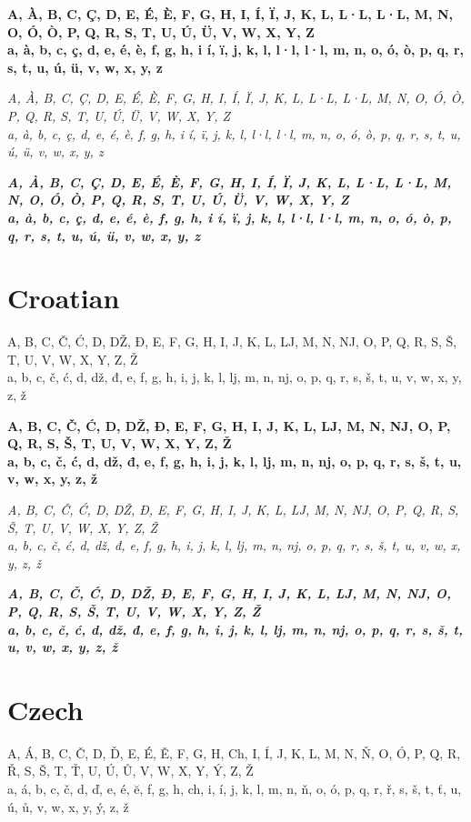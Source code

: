 \documentclass[12pt]{article}
\begin{document}
\textbf{
A, À, B, C, Ç, D, E, É, È, F, G, H, I, Í, Ï, J, K, L, L·L, L·L, M, N, O, Ó, Ò, P, Q, R, S, T, U, Ú, Ü, V, W, X, Y, Z \\
a, à, b, c, ç, d, e, é, è, f, g, h, i í, ï, j, k, l, l·l, l·l, m, n, o, ó, ò, p, q, r, s, t, u, ú, ü, v, w, x, y, z
}

\textit{
A, À, B, C, Ç, D, E, É, È, F, G, H, I, Í, Ï, J, K, L, L·L, L·L, M, N, O, Ó, Ò, P, Q, R, S, T, U, Ú, Ü, V, W, X, Y, Z \\
a, à, b, c, ç, d, e, é, è, f, g, h, i í, ï, j, k, l, l·l, l·l, m, n, o, ó, ò, p, q, r, s, t, u, ú, ü, v, w, x, y, z
}

\textbf{\textit{
A, À, B, C, Ç, D, E, É, È, F, G, H, I, Í, Ï, J, K, L, L·L, L·L, M, N, O, Ó, Ò, P, Q, R, S, T, U, Ú, Ü, V, W, X, Y, Z \\
a, à, b, c, ç, d, e, é, è, f, g, h, i í, ï, j, k, l, l·l, l·l, m, n, o, ó, ò, p, q, r, s, t, u, ú, ü, v, w, x, y, z
}}


\section{Croatian}
A, B, C, Č, Ć, D, DŽ, Đ, E, F, G, H, I, J, K, L, LJ, M, N, NJ, O, P, Q, R, S, Š, T, U, V, W,  X, Y, Z, Ž \\
a, b, c, č, ć, d, dž, đ, e, f, g, h, i, j, k, l, lj, m, n, nj, o, p, q, r, s, š, t, u, v, w, x, y, z, ž

\textbf{
A, B, C, Č, Ć, D, DŽ, Đ, E, F, G, H, I, J, K, L, LJ, M, N, NJ, O, P, Q, R, S, Š, T, U, V, W,  X, Y, Z, Ž \\
a, b, c, č, ć, d, dž, đ, e, f, g, h, i, j, k, l, lj, m, n, nj, o, p, q, r, s, š, t, u, v, w, x, y, z, ž
}

\textit{
A, B, C, Č, Ć, D, DŽ, Đ, E, F, G, H, I, J, K, L, LJ, M, N, NJ, O, P, Q, R, S, Š, T, U, V, W,  X, Y, Z, Ž \\
a, b, c, č, ć, d, dž, đ, e, f, g, h, i, j, k, l, lj, m, n, nj, o, p, q, r, s, š, t, u, v, w, x, y, z, ž
}

\textbf{\textit{
A, B, C, Č, Ć, D, DŽ, Đ, E, F, G, H, I, J, K, L, LJ, M, N, NJ, O, P, Q, R, S, Š, T, U, V, W,  X, Y, Z, Ž \\
a, b, c, č, ć, d, dž, đ, e, f, g, h, i, j, k, l, lj, m, n, nj, o, p, q, r, s, š, t, u, v, w, x, y, z, ž
}}


\clearpage
\section{Czech}
A, Á, B, C, Č, D, Ď, E, É, Ě, F, G, H, Ch, I, Í, J, K, L, M, N, Ň, O, Ó, P, Q, R, Ř, S, Š, T, Ť, U, Ú, Ů, V, W, X, Y, Ý, Z, Ž \\
a, á, b, c, č, d, ď, e, é, ĕ, f, g, h, ch, i, í, j, k, l, m, n, ň, o, ó, p, q, r, ř, s, š, t, ť, u, ú, ů, v, w, x, y, ý, z, ž
\end{document}
